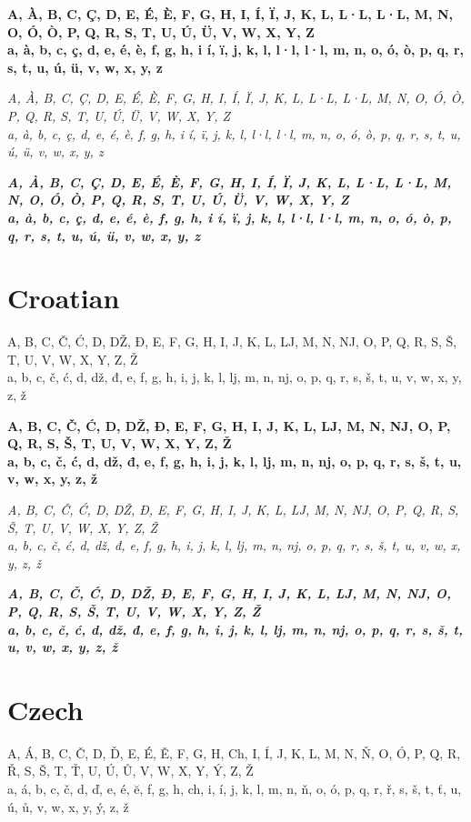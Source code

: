 \documentclass[12pt]{article}
\begin{document}
\textbf{
A, À, B, C, Ç, D, E, É, È, F, G, H, I, Í, Ï, J, K, L, L·L, L·L, M, N, O, Ó, Ò, P, Q, R, S, T, U, Ú, Ü, V, W, X, Y, Z \\
a, à, b, c, ç, d, e, é, è, f, g, h, i í, ï, j, k, l, l·l, l·l, m, n, o, ó, ò, p, q, r, s, t, u, ú, ü, v, w, x, y, z
}

\textit{
A, À, B, C, Ç, D, E, É, È, F, G, H, I, Í, Ï, J, K, L, L·L, L·L, M, N, O, Ó, Ò, P, Q, R, S, T, U, Ú, Ü, V, W, X, Y, Z \\
a, à, b, c, ç, d, e, é, è, f, g, h, i í, ï, j, k, l, l·l, l·l, m, n, o, ó, ò, p, q, r, s, t, u, ú, ü, v, w, x, y, z
}

\textbf{\textit{
A, À, B, C, Ç, D, E, É, È, F, G, H, I, Í, Ï, J, K, L, L·L, L·L, M, N, O, Ó, Ò, P, Q, R, S, T, U, Ú, Ü, V, W, X, Y, Z \\
a, à, b, c, ç, d, e, é, è, f, g, h, i í, ï, j, k, l, l·l, l·l, m, n, o, ó, ò, p, q, r, s, t, u, ú, ü, v, w, x, y, z
}}


\section{Croatian}
A, B, C, Č, Ć, D, DŽ, Đ, E, F, G, H, I, J, K, L, LJ, M, N, NJ, O, P, Q, R, S, Š, T, U, V, W,  X, Y, Z, Ž \\
a, b, c, č, ć, d, dž, đ, e, f, g, h, i, j, k, l, lj, m, n, nj, o, p, q, r, s, š, t, u, v, w, x, y, z, ž

\textbf{
A, B, C, Č, Ć, D, DŽ, Đ, E, F, G, H, I, J, K, L, LJ, M, N, NJ, O, P, Q, R, S, Š, T, U, V, W,  X, Y, Z, Ž \\
a, b, c, č, ć, d, dž, đ, e, f, g, h, i, j, k, l, lj, m, n, nj, o, p, q, r, s, š, t, u, v, w, x, y, z, ž
}

\textit{
A, B, C, Č, Ć, D, DŽ, Đ, E, F, G, H, I, J, K, L, LJ, M, N, NJ, O, P, Q, R, S, Š, T, U, V, W,  X, Y, Z, Ž \\
a, b, c, č, ć, d, dž, đ, e, f, g, h, i, j, k, l, lj, m, n, nj, o, p, q, r, s, š, t, u, v, w, x, y, z, ž
}

\textbf{\textit{
A, B, C, Č, Ć, D, DŽ, Đ, E, F, G, H, I, J, K, L, LJ, M, N, NJ, O, P, Q, R, S, Š, T, U, V, W,  X, Y, Z, Ž \\
a, b, c, č, ć, d, dž, đ, e, f, g, h, i, j, k, l, lj, m, n, nj, o, p, q, r, s, š, t, u, v, w, x, y, z, ž
}}


\clearpage
\section{Czech}
A, Á, B, C, Č, D, Ď, E, É, Ě, F, G, H, Ch, I, Í, J, K, L, M, N, Ň, O, Ó, P, Q, R, Ř, S, Š, T, Ť, U, Ú, Ů, V, W, X, Y, Ý, Z, Ž \\
a, á, b, c, č, d, ď, e, é, ĕ, f, g, h, ch, i, í, j, k, l, m, n, ň, o, ó, p, q, r, ř, s, š, t, ť, u, ú, ů, v, w, x, y, ý, z, ž
\end{document}
